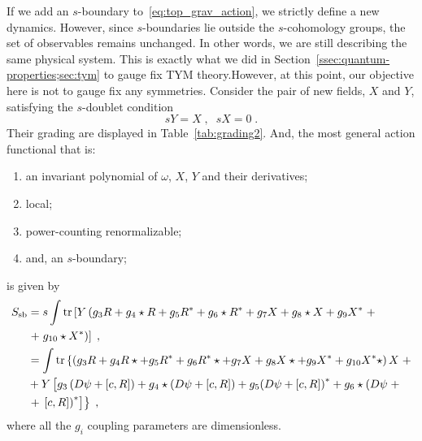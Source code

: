 \documentclass[../main.tex]{subfiles}
\begin{document}
If we add an $s$-boundary to~\eqref{eq:top_grav_action}, we strictly define a new dynamics. However, since $s$-boundaries lie outside the $s$-cohomology groups, the set of observables remains unchanged. In other words, we are still describing the same physical system. This is exactly what we did in Section~\ref{ssec:quantum-properties;sec:tym} to gauge fix TYM theory.\@ However, at this point, our objective here is not to gauge fix any symmetries. Consider the pair of new fields, $X$ and $Y$, satisfying the $s$-doublet condition
\begin{equation}
  \label{eq:s-doublet}
  sY = X \;, \;\; sX = 0 \;.
\end{equation}
Their grading are displayed in Table~\ref{tab:grading2}. And, the most general action functional that is:
\begin{enumerate}[label=\roman*)] %
  \item an invariant polynomial of $\omega$, $X$, $Y$ and their derivatives;
  \item local;
  \item power-counting renormalizable;
  \item  and, an $s$-boundary;
\end{enumerate}
is given by
\begin{subequations}%
  \label{eq:s-boundary_action}
  \begin{align}
    S_{\text{sb}} & = s \int \tr \left[ Y \left( g_3 R + g_4 \star R + g_5 R^* + g_6 \star R^* + g_7 X + g_8 \star X + g_9 X^* \right. + \right.                                                                \nonumber                                               \\
                  & \left. + \left. g_{10} \star X^* \right) \right] \;,                                                                                                                                                                                                \\
                  & = \int \tr \left\{ \left( g_3 R + g_4 R \star + g_5 R^* + g_6 R^* \star + g_7 X + g_8 X \star + g_9 X^* + g_{10} X^* \star \right) X \right. +                                                       \nonumber                                      \\
                  & + Y \left[ g_3 \left( D \psi + \left[ c , R \right] \right) + g_4 \star \left( D \psi + \left[ c , R \right] \right) + g_5 {\left( D \psi + \left[ c , R \right] \right)}^* + g_6 \star \left( D \psi \right. + \right.                   \nonumber \\
                  & \left. + \left. { \left. \left[ c , R \right] \right) }^* \right] \right\} \;,                                                                                                                                                                      %
  \end{align}
\end{subequations}
where all the $g_i$ coupling parameters are dimensionless.
\end{document}
